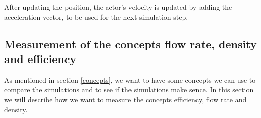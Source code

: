 After updating the position, the actor's velocity is updated by adding the 
acceleration vector, to be used for the next simulation step.

%
%
%
%
%
%
%

\subsection{Measurement of the concepts flow rate, density and efficiency}
As mentioned in section \ref{concepts}, we want to have some concepts we can use to compare
the simulations and to see if the simulations make sence.
In this section we will describe how we want to measure the concepts efficiency,
flow rate and density.

